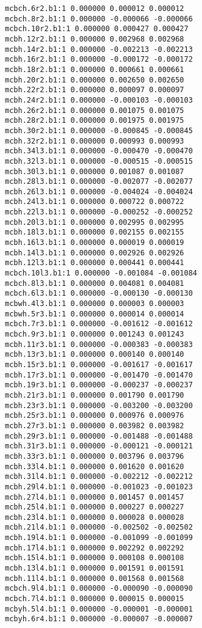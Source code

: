 \begin{verbatim}
mcbch.6r2.b1:1 0.000000 0.000012 0.000012
mcbch.8r2.b1:1 0.000000 -0.000066 -0.000066
mcbch.10r2.b1:1 0.000000 0.000427 0.000427
mcbh.12r2.b1:1 0.000000 0.002968 0.002968
mcbh.14r2.b1:1 0.000000 -0.002213 -0.002213
mcbh.16r2.b1:1 0.000000 -0.000172 -0.000172
mcbh.18r2.b1:1 0.000000 0.000661 0.000661
mcbh.20r2.b1:1 0.000000 0.002650 0.002650
mcbh.22r2.b1:1 0.000000 0.000097 0.000097
mcbh.24r2.b1:1 0.000000 -0.000103 -0.000103
mcbh.26r2.b1:1 0.000000 0.001075 0.001075
mcbh.28r2.b1:1 0.000000 0.001975 0.001975
mcbh.30r2.b1:1 0.000000 -0.000845 -0.000845
mcbh.32r2.b1:1 0.000000 0.000993 0.000993
mcbh.34l3.b1:1 0.000000 -0.000470 -0.000470
mcbh.32l3.b1:1 0.000000 -0.000515 -0.000515
mcbh.30l3.b1:1 0.000000 0.001087 0.001087
mcbh.28l3.b1:1 0.000000 -0.002077 -0.002077
mcbh.26l3.b1:1 0.000000 -0.004024 -0.004024
mcbh.24l3.b1:1 0.000000 0.000722 0.000722
mcbh.22l3.b1:1 0.000000 -0.000252 -0.000252
mcbh.20l3.b1:1 0.000000 0.002995 0.002995
mcbh.18l3.b1:1 0.000000 0.002155 0.002155
mcbh.16l3.b1:1 0.000000 0.000019 0.000019
mcbh.14l3.b1:1 0.000000 0.002926 0.002926
mcbh.12l3.b1:1 0.000000 0.000441 0.000441
mcbch.10l3.b1:1 0.000000 -0.001084 -0.001084
mcbch.8l3.b1:1 0.000000 0.004081 0.004081
mcbch.6l3.b1:1 0.000000 -0.000130 -0.000130
mcbwh.4l3.b1:1 0.000000 0.000003 0.000003
mcbwh.5r3.b1:1 0.000000 0.000014 0.000014
mcbch.7r3.b1:1 0.000000 -0.001612 -0.001612
mcbch.9r3.b1:1 0.000000 0.001243 0.001243
mcbh.11r3.b1:1 0.000000 -0.000383 -0.000383
mcbh.13r3.b1:1 0.000000 0.000140 0.000140
mcbh.15r3.b1:1 0.000000 -0.001617 -0.001617
mcbh.17r3.b1:1 0.000000 -0.001470 -0.001470
mcbh.19r3.b1:1 0.000000 -0.000237 -0.000237
mcbh.21r3.b1:1 0.000000 0.001790 0.001790
mcbh.23r3.b1:1 0.000000 -0.003200 -0.003200
mcbh.25r3.b1:1 0.000000 0.000976 0.000976
mcbh.27r3.b1:1 0.000000 0.003982 0.003982
mcbh.29r3.b1:1 0.000000 -0.001488 -0.001488
mcbh.31r3.b1:1 0.000000 -0.000121 -0.000121
mcbh.33r3.b1:1 0.000000 0.003796 0.003796
mcbh.33l4.b1:1 0.000000 0.001620 0.001620
mcbh.31l4.b1:1 0.000000 -0.002212 -0.002212
mcbh.29l4.b1:1 0.000000 -0.001023 -0.001023
mcbh.27l4.b1:1 0.000000 0.001457 0.001457
mcbh.25l4.b1:1 0.000000 0.000227 0.000227
mcbh.23l4.b1:1 0.000000 0.000028 0.000028
mcbh.21l4.b1:1 0.000000 -0.002502 -0.002502
mcbh.19l4.b1:1 0.000000 -0.001099 -0.001099
mcbh.17l4.b1:1 0.000000 0.002292 0.002292
mcbh.15l4.b1:1 0.000000 0.000108 0.000108
mcbh.13l4.b1:1 0.000000 0.001591 0.001591
mcbh.11l4.b1:1 0.000000 0.001568 0.001568
mcbch.9l4.b1:1 0.000000 -0.000090 -0.000090
mcbch.7l4.b1:1 0.000000 0.000015 0.000015
mcbyh.5l4.b1:1 0.000000 -0.000001 -0.000001
mcbyh.6r4.b1:1 0.000000 -0.000007 -0.000007

\end{verbatim}

